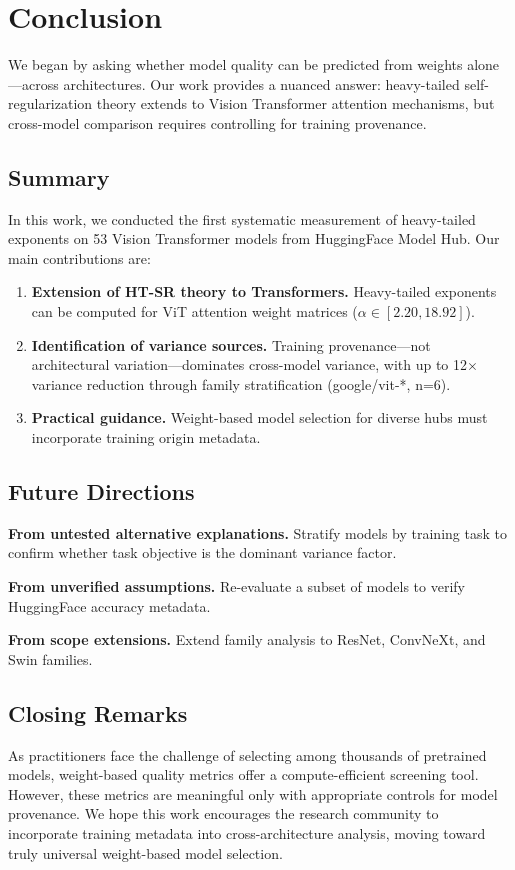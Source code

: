 \section{Conclusion}
\label{sec:conclusion}

We began by asking whether model quality can be predicted from weights alone---across architectures. Our work provides a nuanced answer: heavy-tailed self-regularization theory extends to Vision Transformer attention mechanisms, but cross-model comparison requires controlling for training provenance.

\subsection{Summary}

In this work, we conducted the first systematic measurement of heavy-tailed exponents on 53 Vision Transformer models from HuggingFace Model Hub. Our main contributions are:

\begin{enumerate}
    \item \textbf{Extension of HT-SR theory to Transformers.} Heavy-tailed exponents can be computed for ViT attention weight matrices ($\alpha \in [2.20, 18.92]$).

    \item \textbf{Identification of variance sources.} Training provenance---not architectural variation---dominates cross-model variance, with up to 12$\times$ variance reduction through family stratification (google/vit-*, n=6).

    \item \textbf{Practical guidance.} Weight-based model selection for diverse hubs must incorporate training origin metadata.
\end{enumerate}

\subsection{Future Directions}

\textbf{From untested alternative explanations.} Stratify models by training task to confirm whether task objective is the dominant variance factor.

\textbf{From unverified assumptions.} Re-evaluate a subset of models to verify HuggingFace accuracy metadata.

\textbf{From scope extensions.} Extend family analysis to ResNet, ConvNeXt, and Swin families.

\subsection{Closing Remarks}

As practitioners face the challenge of selecting among thousands of pretrained models, weight-based quality metrics offer a compute-efficient screening tool. However, these metrics are meaningful only with appropriate controls for model provenance. We hope this work encourages the research community to incorporate training metadata into cross-architecture analysis, moving toward truly universal weight-based model selection.

